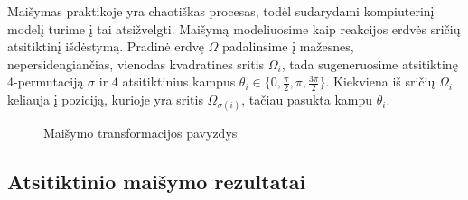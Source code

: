 Maišymas praktikoje yra chaotiškas procesas, todėl sudarydami kompiuterinį modelį turime į tai atsižvelgti. Maišymą modeliuosime kaip reakcijos erdvės sričių atsitiktinį išdėstymą. Pradinė erdvę $\Omega$ padalinsime į mažesnes, nepersidengiančias, vienodas kvadratines sritis $\Omega_i$, tada sugeneruosime atsitiktinę $4$-permutaciją $\sigma$ ir $4$ atsitiktinius kampus $\theta_i \in \{0, \frac{\pi}{2}, \pi, \frac{3\pi}{2}\}$. Kiekviena iš sričių $\Omega_i$ keliauja į poziciją, kurioje yra sritis $\Omega_{\sigma(i)}$, tačiau pasukta kampu $\theta_i$. 

\begin{figure}[!h]
\centering
\label{split-reaction-space}

\caption{Maišymo transformacijos pavyzdys}
\end{figure}

\newpage
\subsection{Atsitiktinio maišymo rezultatai}


